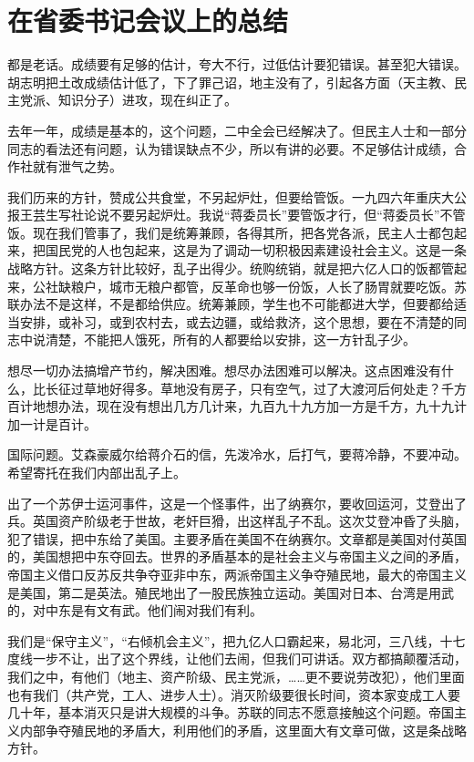 \section[在省委书记会议上的总结（一九五七年一月）]{在省委书记会议上的总结}


都是老话。成绩要有足够的估计，夸大不行，过低估计要犯错误。甚至犯大错误。胡志明把土改成绩估计低了，下了罪己诏，地主没有了，引起各方面（天主教、民主党派、知识分子）进攻，现在纠正了。

去年一年，成绩是基本的，这个问题，二中全会已经解决了。但民主人士和一部分同志的看法还有问题，认为错误缺点不少，所以有讲的必要。不足够估计成绩，合作社就有泄气之势。

我们历来的方针，赞成公共食堂，不另起炉灶，但要给管饭。一九四六年重庆大公报王芸生写社论说不要另起炉灶。我说“蒋委员长”要管饭才行，但“蒋委员长”不管饭。现在我们管事了，我们是统筹兼顾，各得其所，把各党各派，民主人士都包起来，把国民党的人也包起来，这是为了调动一切积极因素建设社会主义。这是一条战略方针。这条方针比较好，乱子出得少。统购统销，就是把六亿人口的饭都管起来，公社缺粮户，城市无粮户都管，反革命也够一份饭，人长了肠胃就要吃饭。苏联办法不是这样，不是都给供应。统筹兼顾，学生也不可能都进大学，但要都给适当安排，或补习，或到农村去，或去边疆，或给救济，这个思想，要在不清楚的同志中说清楚，不能把人饿死，所有的人都要给以安排，这一方针乱子少。

想尽一切办法搞增产节约，解决困难。想尽办法困难可以解决。这点困难没有什么，比长征过草地好得多。草地没有房子，只有空气，过了大渡河后何处走？千方百计地想办法，现在没有想出几方几计来，九百九十九方加一方是千方，九十九计加一计是百计。

国际问题。艾森豪威尔给蒋介石的信，先泼冷水，后打气，要蒋冷静，不要冲动。希望寄托在我们内部出乱子上。

出了一个苏伊士运河事件，这是一个怪事件，出了纳赛尔，要收回运河，艾登出了兵。英国资产阶级老于世故，老奸巨猾，出这样乱子不乱。这次艾登冲昏了头脑，犯了错误，把中东给了美国。主要矛盾在美国不在纳赛尔。文章都是美国对付英国的，美国想把中东夺回去。世界的矛盾基本的是社会主义与帝国主义之间的矛盾，帝国主义借口反苏反共争夺亚非中东，两派帝国主义争夺殖民地，最大的帝国主义是美国，第二是英法。殖民地出了一股民族独立运动。美国对日本、台湾是用武的，对中东是有文有武。他们闹对我们有利。

我们是“保守主义”，“右倾机会主义”，把九亿人口霸起来，易北河，三八线，十七度线一步不让，出了这个界线，让他们去闹，但我们可讲话。双方都搞颠覆活动，我们之中，有他们（地主、资产阶级、民主党派，……更不要说劳改犯），他们里面也有我们（共产党，工人、进步人士）。消灭阶级要很长时间，资本家变成工人要几十年，基本消灭只是讲大规模的斗争。苏联的同志不愿意接触这个问题。帝国主义内部争夺殖民地的矛盾大，利用他们的矛盾，这里面大有文章可做，这是条战略方针。

